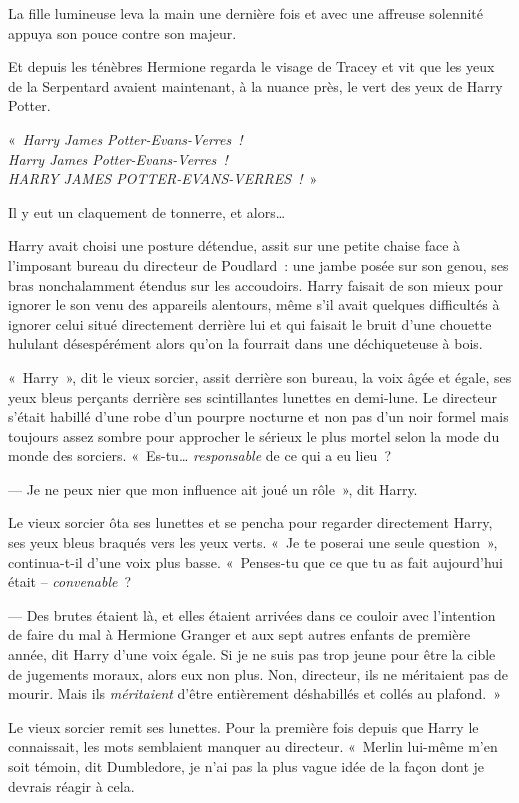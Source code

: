 La fille lumineuse leva la main une dernière fois et avec une affreuse solennité appuya son pouce contre son majeur.

Et depuis les ténèbres Hermione regarda le visage de Tracey et vit que les yeux de la Serpentard avaient maintenant, à la nuance près, le vert des yeux de Harry Potter.

«~\emph{Harry James Potter-Evans-Verres~!\\
Harry James Potter-Evans-Verres~!\\
HARRY JAMES POTTER-EVANS-VERRES~!}~»

Il y eut un claquement de tonnerre, et alors…

\later

Harry avait choisi une posture détendue, assit sur une petite chaise face à l'imposant bureau du directeur de Poudlard~: une jambe posée sur son genou, ses bras nonchalamment étendus sur les accoudoirs. Harry faisait de son mieux pour ignorer le son venu des appareils alentours, même s'il avait quelques difficultés à ignorer celui situé directement derrière lui et qui faisait le bruit d'une chouette hululant désespérément alors qu'on la fourrait dans une déchiqueteuse à bois.

«~Harry~», dit le vieux sorcier, assit derrière son bureau, la voix âgée et égale, ses yeux bleus perçants derrière ses scintillantes lunettes en demi-lune. Le directeur s'était habillé d'une robe d'un pourpre nocturne et non pas d'un noir formel mais toujours assez sombre pour approcher le sérieux le plus mortel selon la mode du monde des sorciers. «~Es-tu… \emph{responsable} de ce qui a eu lieu~?

--- Je ne peux nier que mon influence ait joué un rôle~», dit Harry.

Le vieux sorcier ôta ses lunettes et se pencha pour regarder directement Harry, ses yeux bleus braqués vers les yeux verts. «~Je te poserai une seule question~», continua-t-il d'une voix plus basse. «~Penses-tu que ce que tu as fait aujourd'hui était -- \emph{convenable}~?

--- Des brutes étaient là, et elles étaient arrivées dans ce couloir avec l'intention de faire du mal à Hermione Granger et aux sept autres enfants de première année, dit Harry d'une voix égale. Si je ne suis pas trop jeune pour être la cible de jugements moraux, alors eux non plus. Non, directeur, ils ne méritaient pas de mourir. Mais ils \emph{méritaient} d'être entièrement déshabillés et collés au plafond.~»

Le vieux sorcier remit ses lunettes. Pour la première fois depuis que Harry le connaissait, les mots semblaient manquer au directeur. «~Merlin lui-même m'en soit témoin, dit Dumbledore, je n'ai pas la plus vague idée de la façon dont je devrais réagir à cela.

